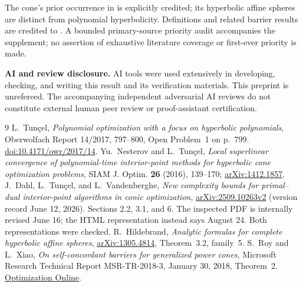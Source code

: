 \documentclass[11pt]{article}
\begin{document}
The cone's prior occurrence in \cite{H} is explicitly credited; its
hyperbolic affine spheres are distinct from polynomial hyperbolicity.
Definitions and related barrier results are credited to \cite{NT,DTV}.
A bounded primary-source priority audit accompanies the supplement;
no assertion of exhaustive literature coverage or first-ever priority
is made.

\textbf{AI and review disclosure.} AI tools were used extensively in
developing, checking, and writing this result and its verification
materials. This preprint is unrefereed. The accompanying independent
adversarial AI reviews do not constitute external human peer review
or proof-assistant certification.

\begin{thebibliography}{9}
 L.~Tun\c{c}el, \emph{Polynomial optimization with a focus on
hyperbolic polynomials}, Oberwolfach Report 14/2017, 797--800,
Open Problem~1 on p.~799.
\href{https://doi.org/10.4171/owr/2017/14}{doi:10.4171/owr/2017/14}.
 Yu.~Nesterov and L.~Tun\c{c}el,
\emph{Local superlinear convergence of polynomial-time interior-point
methods for hyperbolic cone optimization problems}, SIAM J. Optim.
\textbf{26} (2016), 139--170; \href{https://arxiv.org/abs/1412.1857}{arXiv:1412.1857}.
 J.~Dahl, L.~Tun\c{c}el, and L.~Vandenberghe,
\emph{New complexity bounds for primal--dual interior-point algorithms
in conic optimization}, \href{https://arxiv.org/abs/2509.10263}{arXiv:2509.10263v2}
(version record June 12, 2026). Sections 2.2, 3.1, and 6.
The inspected PDF is internally revised June 16; the HTML representation
instead says August 24. Both representations were checked.
 R.~Hildebrand, \emph{Analytic formulas for complete hyperbolic
affine spheres}, \href{https://arxiv.org/abs/1305.4814}{arXiv:1305.4814},
Theorem~3.2, family~5.
 S.~Roy and L.~Xiao, \emph{On self-concordant barriers for
generalized power cones}, Microsoft Research Technical Report
MSR-TR-2018-3, January 30, 2018, Theorem~2.
\href{https://optimization-online.org/2018/01/6441/}{Optimization Online}.
\end{thebibliography}
\end{document}
